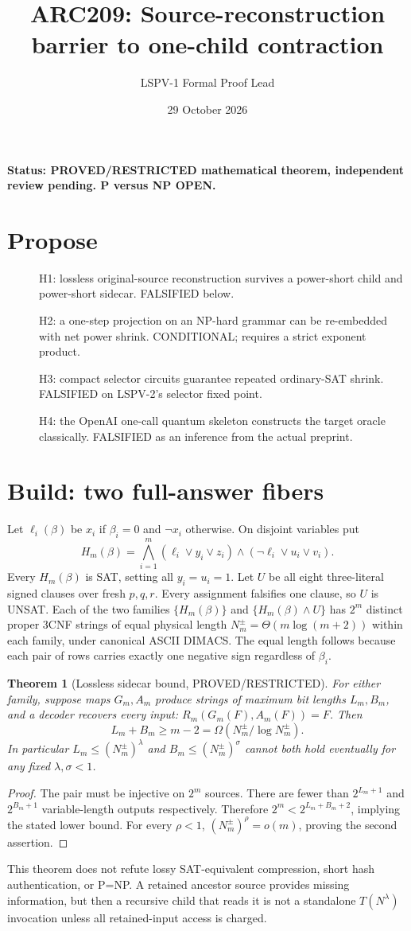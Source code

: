 \documentclass{article}
\title{ARC209: Source-reconstruction barrier to one-child contraction}
\author{LSPV-1 Formal Proof Lead}
\date{29 October 2026}
\newtheorem{theorem}{Theorem}
\begin{document}
\maketitle
\noindent\textbf{Status: PROVED/RESTRICTED mathematical theorem, independent review pending. P versus NP OPEN.}
\section{Propose}
\begin{description}
\item[] H1: lossless original-source reconstruction survives a power-short child and power-short sidecar. FALSIFIED below.
\item[] H2: a one-step projection on an NP-hard grammar can be re-embedded with net power shrink. CONDITIONAL; requires a strict exponent product.
\item[] H3: compact selector circuits guarantee repeated ordinary-SAT shrink. FALSIFIED on LSPV-2's selector fixed point.
\item[] H4: the OpenAI one-call quantum skeleton constructs the target oracle classically. FALSIFIED as an inference from the actual preprint.
\end{description}
\section{Build: two full-answer fibers}
Let $\ell_i(\beta)$ be $x_i$ if $\beta_i=0$ and $\neg x_i$ otherwise. On disjoint variables put
\[
 H_m(\beta)=\bigwedge_{i=1}^m(\ell_i\lor y_i\lor z_i)
       \land(\neg\ell_i\lor u_i\lor v_i).
\]
Every $H_m(\beta)$ is SAT, setting all $y_i=u_i=1$.
Let $U$ be all eight three-literal signed clauses over fresh $p,q,r$.
Every assignment falsifies one clause, so $U$ is UNSAT.
Each of the two families $\{H_m(\beta)\}$ and $\{H_m(\beta)\land U\}$
has $2^m$ distinct proper 3CNF strings of equal physical length
$N_m^\pm=\Theta(m\log(m+2))$ within each family, under canonical ASCII DIMACS.
The equal length follows because each pair of rows carries exactly one
negative sign regardless of $\beta_i$.
\begin{theorem}[Lossless sidecar bound, PROVED/RESTRICTED]
For either family, suppose maps $G_m,A_m$ produce strings of
maximum bit lengths $L_m,B_m$, and a decoder recovers every input:
$R_m(G_m(F),A_m(F))=F$. Then
\[
 L_m+B_m\ge m-2=\Omega(N_m^\pm/\log N_m^\pm).
\]
In particular $L_m\le (N_m^\pm)^\lambda$ and
$B_m\le(N_m^\pm)^\sigma$ cannot both hold eventually
for any fixed $\lambda,\sigma<1$.
\end{theorem}
\begin{proof}
The pair must be injective on $2^m$ sources. There are fewer than
$2^{L_m+1}$ and $2^{B_m+1}$ variable-length outputs respectively.
Therefore $2^m<2^{L_m+B_m+2}$, implying the stated lower bound.
For every $\rho<1$, $(N_m^\pm)^\rho=o(m)$, proving the second assertion.
\end{proof}
\noindent This theorem does not refute lossy SAT-equivalent
compression, short hash authentication, or P=NP.
A retained ancestor source provides missing information, but then
a recursive child that reads it is not a standalone $T(N^\lambda)$
invocation unless all retained-input access is charged.
\end{document}
